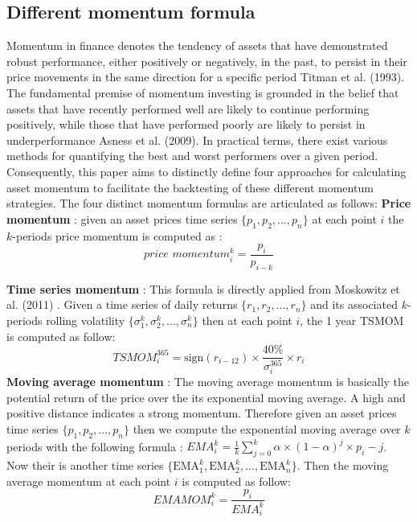 \documentclass{article}
\begin{document}
\subsection{Different momentum formula}\label{sec:momentumformulas}
Momentum in finance denotes the tendency of assets that have demonstrated robust performance, either positively or negatively, in the past, to persist in their price movements in the same direction for a specific period Titman et al. (1993)\cite{Titman1993}. The fundamental premise of momentum investing is grounded in the belief that assets that have recently performed well are likely to continue performing positively, while those that have performed poorly are likely to persist in underperformance Asness et al. (2009)\cite{Asness2009}.
\newline
In practical terms, there exist various methods for quantifying the best and worst performers over a given period. Consequently, this paper aims to distinctly define four approaches for calculating asset momentum to facilitate the backtesting of these different momentum strategies.
\newline
The four distinct momentum formulas are articulated as follows:
\newline\newline
\textbf{Price momentum} : given an asset prices time series $\{p_1, p_2, ..., p_n\}$ at each point $i$ the $k$-periods price momentum is computed as : $$\textit{price momentum}^{k}_i = \frac{p_i}{p_{i-k}}$$ \newline

\textbf{Time series momentum} : This formula is directly applied from Moskowitz et al. (2011) \cite{Moskowitz2011}. Given a time series of daily returns $\{r_1, r_2, ..., r_n\}$ and its associated $k$-periods rolling volatility $\{\sigma_1^k, \sigma_2^k, ..., \sigma_n^k\}$ then at each point $i$, the 1 year TSMOM is computed as follow: $$\textit{TSMOM}^{365}_{i}=\text{sign}(r_{i-12})\times\frac{40\text{\%}}{\sigma_i^365}\times r_i$$ \newline
\textbf{Moving average momentum} : The moving average momentum is basically the potential return of the price over the its exponential moving average. A high and positive distance indicates a strong momentum. Therefore given an asset prices time series $\{p_1, p_2, ..., p_n\}$ then we compute the exponential moving average over $k$ periods with the following formula : $\textit{EMA}^k_i=\frac{1}{k}\sum_{j=0}^k \alpha\times(1-\alpha)^j\times p_i-j$. Now their is  another time series $\{\text{EMA}_1^k, \text{EMA}_2^k, ..., \text{EMA}_n^k\}$. Then the moving average momentum at each point $i$ is computed as follow: $$\textit{EMAMOM}^k_i=\frac{p_i}{EMA_i^k}$$\newline
\end{document}
